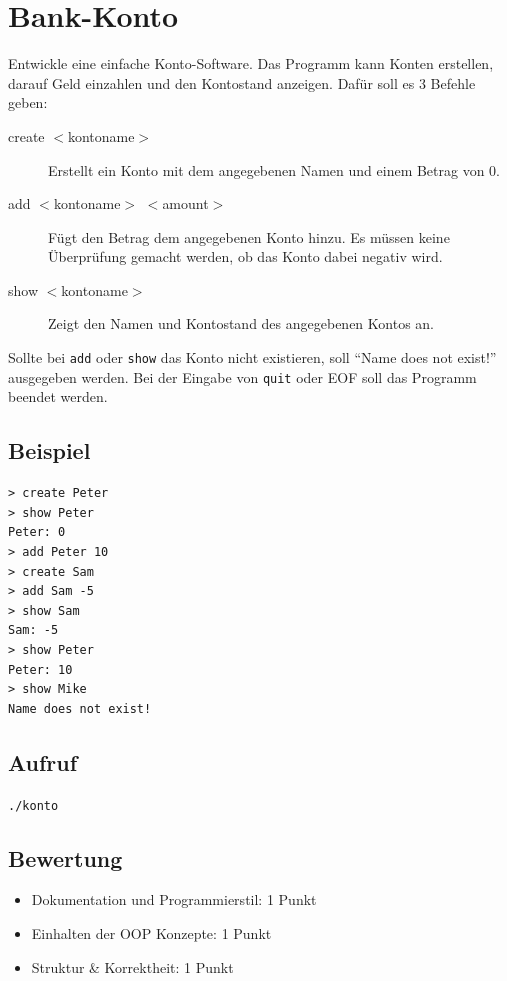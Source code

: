 \documentclass[a4paper,10pt]{article}
\begin{document}
\section*{Bank-Konto}

Entwickle eine einfache Konto-Software. Das Programm kann Konten erstellen, darauf Geld einzahlen und den Kontostand anzeigen. Dafür soll es 3 Befehle geben:

\begin{description}
 \item[create $<$kontoname$>$] Erstellt ein Konto mit dem angegebenen Namen und einem Betrag von 0.
 \item[add $<$kontoname$>$ $<$amount$>$] Fügt den Betrag dem angegebenen Konto hinzu. Es müssen keine Überprüfung gemacht werden, ob das Konto dabei negativ wird.
 \item[show $<$kontoname$>$] Zeigt den Namen und Kontostand des angegebenen Kontos an.
\end{description}

Sollte bei \texttt{add} oder \texttt{show} das Konto nicht existieren, soll ``Name does not exist!'' ausgegeben werden. Bei der Eingabe von \texttt{quit} oder EOF soll das Programm beendet werden.

\subsection*{Beispiel}
\begin{verbatim}
> create Peter
> show Peter
Peter: 0
> add Peter 10
> create Sam
> add Sam -5
> show Sam
Sam: -5
> show Peter
Peter: 10
> show Mike
Name does not exist!
\end{verbatim}

\subsection*{Aufruf}
\texttt{./konto}

\subsection*{Bewertung}
\begin{itemize}
 \item Dokumentation und Programmierstil: 1 Punkt
 \item Einhalten der OOP Konzepte: 1 Punkt
 \item Struktur \& Korrektheit: 1 Punkt
\end{itemize}

\newpage
\end{document}
